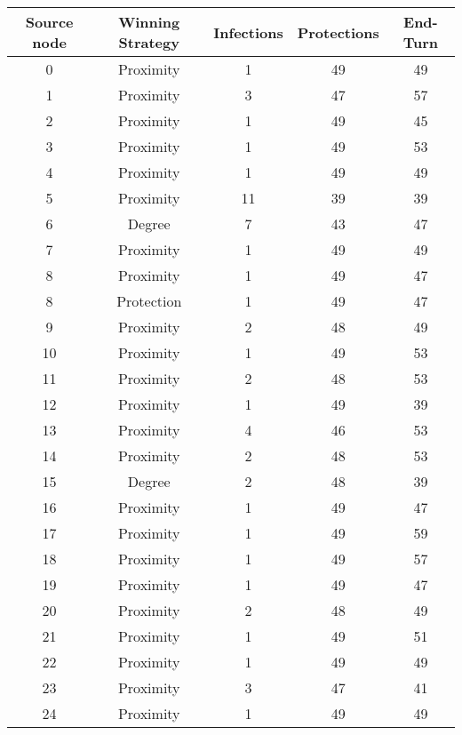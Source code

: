 \documentclass[results.tex]{subfiles}
\begin{document}
\begin{center}
  \begin{tabular}{| c || c | c | c | c |}
    \hline
    {\bfseries Source node} & {\bfseries Winning Strategy} & {\bfseries Infections} & {\bfseries Protections} & {\bfseries End-Turn} \\  %
    \hline\hline
    0 & Proximity & 1 & 49 & 49 \\ 
    \hline
    1 & Proximity & 3 & 47 & 57 \\ 
    \hline
    2 & Proximity & 1 & 49 & 45 \\ 
    \hline
    3 & Proximity & 1 & 49 & 53 \\ 
    \hline
    4 & Proximity & 1 & 49 & 49 \\ 
    \hline
    5 & Proximity & 11 & 39 & 39 \\ 
    \hline
    6 & Degree & 7 & 43 & 47 \\ 
    \hline
    7 & Proximity & 1 & 49 & 49 \\ 
    \hline
    8 & Proximity & 1 & 49 & 47 \\ 
    \hline
    8 & Protection & 1 & 49 & 47 \\ 
    \hline
    9 & Proximity & 2 & 48 & 49 \\ 
    \hline
    10 & Proximity & 1 & 49 & 53 \\ 
    \hline
    11 & Proximity & 2 & 48 & 53 \\ 
    \hline
    12 & Proximity & 1 & 49 & 39 \\ 
    \hline
    13 & Proximity & 4 & 46 & 53 \\ 
    \hline
    14 & Proximity & 2 & 48 & 53 \\ 
    \hline
    15 & Degree & 2 & 48 & 39 \\ 
    \hline
    16 & Proximity & 1 & 49 & 47 \\ 
    \hline
    17 & Proximity & 1 & 49 & 59 \\ 
    \hline
    18 & Proximity & 1 & 49 & 57 \\ 
    \hline
    19 & Proximity & 1 & 49 & 47 \\ 
    \hline
    20 & Proximity & 2 & 48 & 49 \\ 
    \hline
    21 & Proximity & 1 & 49 & 51 \\ 
    \hline
    22 & Proximity & 1 & 49 & 49 \\ 
    \hline
    23 & Proximity & 3 & 47 & 41 \\ 
    \hline
    24 & Proximity & 1 & 49 & 49 \\ 

\end{tabular}
\end{center}
\end{document}
